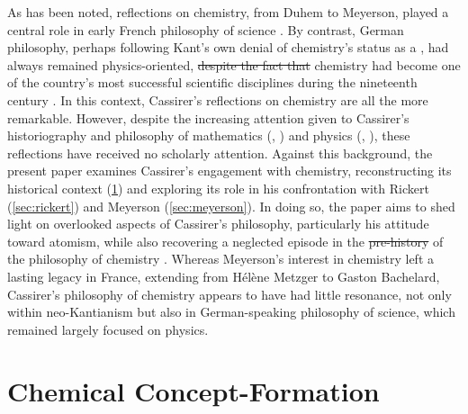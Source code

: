 \documentclass[submitted,12pt]{article}
\providecommand{\DIFadd}[1]{{\protect\color{blue}\uwave{#1}}} %
\providecommand{\DIFdel}[1]{{\protect\color{red}\sout{#1}}}                      %
\providecommand{\DIFaddbegin}{} %
\providecommand{\DIFaddend}{} %
\providecommand{\DIFdelbegin}{} %
\providecommand{\DIFdelend}{} %
\begin{document}
As has been noted, reflections on chemistry, from Duhem to Meyerson, played a central role in early French philosophy of science \citep{Bensaude-Vincent2009a}. By contrast, German philosophy, perhaps following Kant's own denial of chemistry's status as a , had always remained physics-oriented, \DIFdelbegin \DIFdel{despite the fact that }\DIFdelend \DIFaddbegin \DIFadd{although }\DIFaddend chemistry had become one of the country's most successful scientific disciplines during the nineteenth century \citep{Rocke2021}. In this context, Cassirer's reflections on chemistry are all the more remarkable. However, despite the increasing attention given to Cassirer's historiography and philosophy of mathematics (\cite{Schiemer2018}, \cite{Reck2020}) and physics (\cite{Ryckman2005}, \cite{French2014}), these reflections have received no scholarly attention. Against this background, the present paper examines Cassirer's engagement with chemistry, reconstructing its historical context (\cref{sec:chemistry}) and exploring its role in his confrontation with Rickert (\cref{sec:rickert}) and Meyerson (\cref{sec:meyerson}). In doing so, the paper aims to shed light on overlooked aspects of Cassirer’s philosophy, particularly his attitude toward atomism, while also recovering a neglected episode in the \DIFdelbegin \DIFdel{pre-history }\DIFdelend \DIFaddbegin \DIFadd{prehistory }\DIFaddend of the philosophy of chemistry \citep{VanBrakel2012}. Whereas Meyerson's interest in chemistry left a lasting legacy in France, extending from H{\'e}l{\`e}ne Metzger to Gaston Bachelard, Cassirer's philosophy of chemistry appears to have had little resonance, not only within neo-Kantianism but also in German-speaking philosophy of science, which remained largely focused on physics.

\section{Chemical Concept-Formation}
\label{sec:chemistry}
\end{document}
